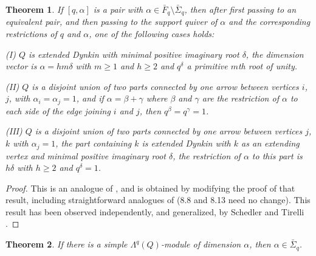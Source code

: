 \documentclass[12pt,a4paper]{amsart}
\theoremstyle{plain}
\newtheorem{thm}{Theorem}[section]
\begin{document}
\begin{thm}
\label{t:reducetocases}
If $[q,\alpha]$ is a pair with $\alpha\in \bar F_q \setminus \bar\Sigma_q$, then after first passing to an 
equivalent pair, and then passing to the support quiver of $\alpha$ and the corresponding restrictions of $q$ and $\alpha$,
one of the following cases holds:

(I) $Q$ is extended Dynkin with minimal positive imaginary root $\delta$, 
the dimension vector is $\alpha = h m \delta$ with $m\ge 1$ and $h\ge 2$ 
and $q^{\delta}$ a primitive $m$th root of unity.

(II) $Q$ is a disjoint union of two parts connected by one arrow between vertices $i$, $j$, with $\alpha_i = \alpha_j=1$,
and if $\alpha = \beta+\gamma$ where $\beta$ and $\gamma$ are the restriction of $\alpha$ to each
side of the edge joining $i$ and $j$, then $q^\beta = q^\gamma = 1$.

(III) $Q$ is a disjoint union of two parts connected by one arrow between vertices $j$, $k$ with $\alpha_j=1$, 
the part containing $k$ is extended Dynkin with $k$ as an extending vertex and minimal positive imaginary root $\delta$, 
the restriction of $\alpha$ to this part is $h\delta$ with $h\ge 2$ and $q^{\delta}=1$.
\end{thm}



\begin{proof}
This is an analogue of \cite[Theorem 8.1]{CBmm}, and is obtained by modifying the proof of that result, including straightforward analogues of \cite[Lemmas 8.2--8.15]{CBmm} (8.8 and 8.13 need no change). 
This result has been observed independently, and generalized, by Schedler and Tirelli \cite[Theorem 6.16]{ST}.
\end{proof}


\begin{thm}
\label{t:mainthmformultpreproj}
If there is a simple $\Lambda^q(Q)$-module of dimension $\alpha$, then $\alpha\in\bar\Sigma_q$.
\end{thm}
\end{document}
